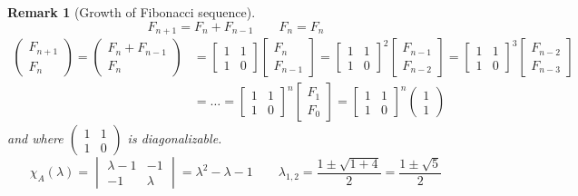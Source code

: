 \documentclass[a4paper]{article}
\numberwithin{lecref}{section}
\newtheorem*{Remark}{Remark}
\newcommand{\vectwo}[2]{\begin{pmatrix} #1 \\ #2 \end{pmatrix}}
\begin{document}
\begin{Remark}[Growth of Fibonacci sequence]
  \[ F_{n+1} = F_n + F_{n-1} \qquad F_n = F_n \]
  \begin{align*}
    \vectwo{F_{n+1}}{F_n}
      = \vectwo{F_n + F_{n-1}}{F_n}
      &= \begin{bmatrix} 1 & 1 \\ 1 & 0 \end{bmatrix} \begin{bmatrix} F_n \\ F_{n-1} \end{bmatrix} 
      = \begin{bmatrix} 1 & 1 \\ 1 & 0 \end{bmatrix}^2 \begin{bmatrix} F_{n-1} \\ F_{n-2} \end{bmatrix} 
      = \begin{bmatrix} 1 & 1 \\ 1 & 0 \end{bmatrix}^3 \begin{bmatrix} F_{n-2} \\ F_{n-3} \end{bmatrix} \\
      &= \dots
      = \begin{bmatrix} 1 & 1 \\ 1 & 0 \end{bmatrix}^n \begin{bmatrix} F_1 \\ F_0 \end{bmatrix}
      = \begin{bmatrix} 1 & 1 \\ 1 & 0 \end{bmatrix}^n \vectwo11
  \end{align*}
  and where $\begin{pmatrix} 1 & 1 \\ 1 & 0 \end{pmatrix}$ is diagonalizable.
  \[
    \chi_A(\lambda) = \begin{vmatrix}
      \lambda-1 & -1 \\
      -1 & \lambda
    \end{vmatrix} = \lambda^2 - \lambda - 1
    \qquad
    \lambda_{1,2} = \frac{1 \pm \sqrt{1 + 4}}{2} = \frac{1 \pm \sqrt{5}}{2}
  \]


\end{Remark}
\end{document}
